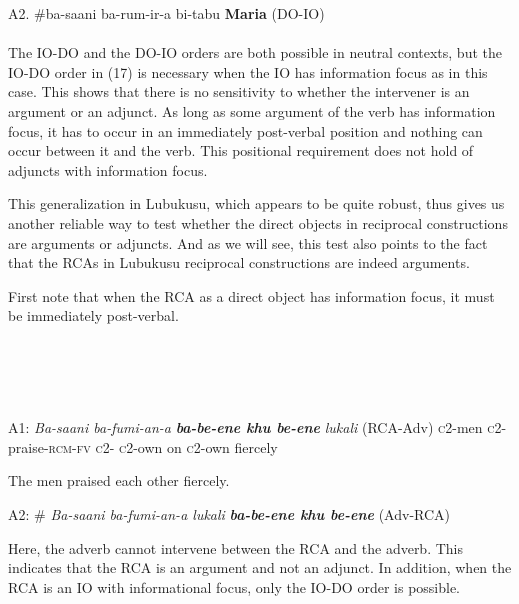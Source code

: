 \documentclass[output=paper]{langsci/langscibook}
\begin{document}
\gll A2.  \#ba-saani  ba-rum-ir-a      bi-tabu   \textbf{Maria}  (DO-IO) \\\\
The IO-DO and the DO-IO orders are both possible in neutral contexts, but the IO-DO order in (17) is necessary when the IO has information focus as in this case. This shows that there is no sensitivity to whether the intervener is an argument or an adjunct. As long as some argument of the verb has information focus, it has to occur in an immediately post-verbal position and nothing can occur between it and the verb. This positional requirement does not hold of adjuncts with information focus.

  This generalization in Lubukusu, which appears to be quite robust, thus gives us another reliable way to test whether the direct objects in reciprocal constructions are arguments or adjuncts. And as we will see, this test also points to the fact that the RCAs in Lubukusu reciprocal constructions are indeed  arguments.

First note that when the RCA as a direct object has information focus, it must be immediately post-verbal. 


\ea\label{ex:}
\\
\ea\label{ex:}
\\
\ea\label{ex:}
\\
\ea\label{ex:}
\\


  A1:   \textit{Ba-saani ba-fumi-an-a}      \textbf{\textit{ba-be-ene    khu be-ene}}\textit{   lukali}    (RCA-Adv)      \textsc{c}2-men   \textsc{c}2-praise-\textsc{rcm-fv}       \textsc{c}2-\textsc{ c}2-own  on   \textsc{c}2-own  fiercely

    The men praised each other fiercely.

  A2:   \#\textit{ Ba-saani ba-fumi-an-a   lukali}\textbf{\textit{       ba-be-ene khu be-ene}}     (Adv-RCA)  

Here, the adverb cannot intervene between the RCA and the adverb. This indicates that the RCA is an argument and not an adjunct. In addition, when the RCA is an IO with informational focus, only the IO-DO order is possible.


\ea\label{ex:}
  \\
\ea\label{ex:}
       \\
\end{document}
